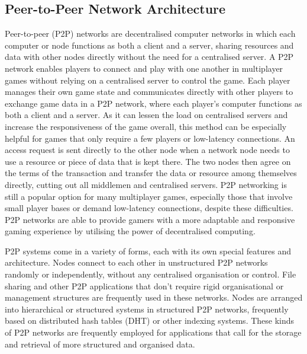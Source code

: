 \subsection{Peer-to-Peer Network Architecture}

Peer-to-peer (P2P) networks are decentralised computer networks in which each computer or node functions as both a client and a server, sharing resources and data with other nodes directly without the need for a centralised server. A P2P network enables players to connect and play with one another in multiplayer games without relying on a centralised server to control the game.\cite{peer-to-peer-gaming-gamasutra}
Each player manages their own game state and communicates directly with other players to exchange game data in a P2P network, where each player's computer functions as both a client and a server. As it can lessen the load on centralised servers and increase the responsiveness of the game overall, this method can be especially helpful for games that only require a few players or low-latency connections.\cite{p2p-networks-multiplayer-games-acm}
An access request is sent directly to the other node when a network node needs to use a resource or piece of data that is kept there. The two nodes then agree on the terms of the transaction and transfer the data or resource among themselves directly, cutting out all middlemen and centralised servers.\cite{understanding-p2p-networking-oracle}
P2P networking is still a popular option for many multiplayer games, especially those that involve small player bases or demand low-latency connections, despite these difficulties. P2P networks are able to provide gamers with a more adaptable and responsive gaming experience by utilising the power of decentralised computing.

P2P systems come in a variety of forms, each with its own special features and architecture.
Nodes connect to each other in unstructured P2P networks randomly or independently, without any centralised organisation or control. File sharing and other P2P applications that don't require rigid organisational or management structures are frequently used in these networks.\cite{peer-to-peer-gaming-gamasutra}
Nodes are arranged into hierarchical or structured systems in structured P2P networks, frequently based on distributed hash tables (DHT) or other indexing systems. These kinds of P2P networks are frequently employed for applications that call for the storage and retrieval of more structured and organised data.\cite{understanding-p2p-networking-oracle}

